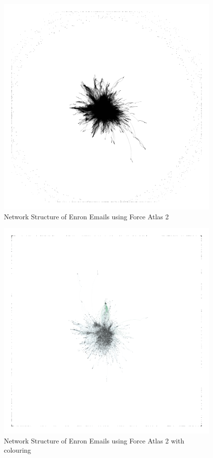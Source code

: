 \documentclass[11pt, oneside]{article}   	%
\begin{document}
		\begin{figure}
  \centering
  \includegraphics[width=\columnwidth]{enron-force-atlas-2.png}
  \caption{Network Structure of Enron Emails using Force Atlas 2 }
\end{figure}
\begin{figure}
  \centering
  \includegraphics[width=\columnwidth]{enron-graphs.png}
  \caption{Network Structure of Enron Emails using Force Atlas 2  with colouring}
\end{figure}
\end{document}
